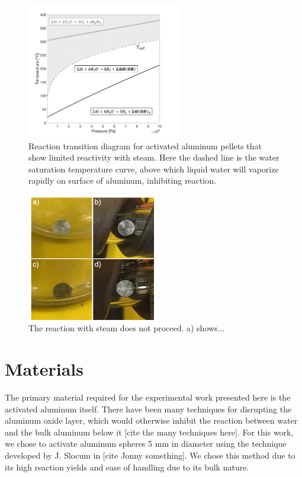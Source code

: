 \documentclass[preprint,12pt,3p]{elsarticle}
\begin{document}
\begin{figure}
  \centering
  \includegraphics[width=0.6\textwidth]{fig/transitions_bp}
  \caption{Reaction transition diagram for activated aluminum pellets that show
  limited reactivity with steam. Here the dashed line is the water saturation
temperature curve, above which liquid water will vaporize rapidly on surface of
aluminum, inhibiting reaction.}
  \label{fig:transitions_bp}
\end{figure}

\begin{figure}
  \centering
  \includegraphics[width=0.5\textwidth]{fig/steam_test_min}
  \caption{The reaction with steam does not proceed. a) shows...}
  \label{fig:steam_test}
\end{figure}

\section{Materials}
\label{materials}

The primary material required for the experimental work presented here is the
activated aluminum itself. There have been many techniques for disrupting the
aluminum oxide layer, which would otherwise inhibit the reaction between water
and the bulk aluminum below it [cite the many techniques here]. For this work,
we chose to activate aluminum spheres 5 mm in diameter using the technique
developed by J. Slocum in [cite Jonny something]. We chose this method due to
its high reaction yields and ease of handling due to its bulk nature.
\end{document}
